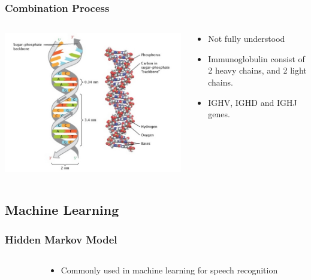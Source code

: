 \documentclass{beamer}
\begin{document}
\begin{frame}
\frametitle{Combination Process}
\begin{columns}
  \begin{column}{.5\textwidth} 
    \includegraphics[width=\textwidth]{dna-strand.jpg}
  \end{column}
  \begin{column}{.5\textwidth} 
    \begin{itemize}
      \item Not fully understood
      \item Immunoglobulin consist of 2 heavy chains, and 2 light chains.
      \item IGHV, IGHD and IGHJ genes.
    \end{itemize}
  \end{column}
\end{columns}
\end{frame}

\subsection{Machine Learning}

\begin{frame}
\frametitle{Hidden Markov Model}
\begin{columns}
  \begin{column}{.5\textwidth} 
  \end{column}
  \begin{column}{.5\textwidth} 
    \begin{itemize}
      \item Commonly used in machine learning for speech recognition
    \end{itemize}
  \end{column}
\end{columns}
\end{frame}
\end{document}
